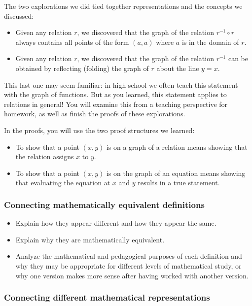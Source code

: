 \documentclass[11pt]{article}
\theoremstyle{definition}
\begin{document}
The two explorations we did tied together representations and the concepts we discussed:
	\begin{itemize}
	\item Given any relation $r$, we discovered that the graph of the relation $r^{-1}\circ r$ always contains all points of the form $(a,a)$ where $a$ is in the domain of $r$.
	\item Given any relation $r$, we discovered that the graph of the relation $r^{-1}$ can be obtained by reflecting (folding) the graph of $r$ about the line $y=x$.
	\end{itemize}
 
This last one may seem familiar: in high school we often teach this statement with the graph of functions. But as you learned, this statement applies to relations in general! You will examine this from a teaching perspective for homework, as well as finish the proofs of these explorations.

In the proofs, you will use the two proof structures we learned: 
\begin{itemize}
\item To show that a point $(x, y)$ is on a graph of a relation
means showing that the relation assigns $x$ to $y$.
\item 
To show that a point $(x, y)$ is on the graph of an equation means showing that evaluating the equation at $x$ and $y$ results in a true statement.
\end{itemize}
  
\subsubsection*{Connecting mathematically equivalent definitions}

\begin{itemize}
\item Explain how they appear different and how they appear the same.
\item Explain why they are mathematically equivalent. 
\item Analyze the mathematical and pedagogical purposes of each definition and why they may be appropriate for different levels of mathematical study, or why one version makes more sense after having worked with another version.
\end{itemize}

\subsubsection*{Connecting different mathematical representations}
\end{document}
